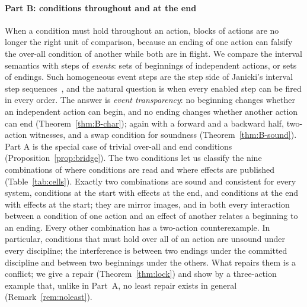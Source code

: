 \documentclass[preprint,12pt]{elsarticle}
\theoremstyle{plain}
\theoremstyle{definition}
\begin{document}
\paragraph{Part B: conditions throughout and at the end}
When a condition must hold throughout an action, blocks of actions are no longer the right unit of comparison, because an ending of one action can falsify the over-all condition of another while both are in flight. We compare the interval semantics with steps of \emph{events}: sets of beginnings of independent actions, or sets of endings. Such homogeneous event steps are the step side of Janicki's interval step sequences~\cite{Janicki2019}, and the natural question is when every enabled step can be fired in every order. The answer is \emph{event transparency}: no beginning changes whether an independent action can begin, and no ending changes whether another action can end (Theorem~\ref{thm:B-char}); again with a forward and a backward half, two-action witnesses, and a swap condition for soundness (Theorem~\ref{thm:B-sound}). Part A is the special case of trivial over-all and end conditions (Proposition~\ref{prop:bridge}). The two conditions let us classify the nine combinations of where conditions are read and where effects are published (Table~\ref{tab:cells}). Exactly two combinations are sound and consistent for every system, conditions at the start with effects at the end, and conditions at the end with effects at the start; they are mirror images, and in both every interaction between a condition of one action and an effect of another relates a beginning to an ending. Every other combination has a two-action counterexample. In particular, conditions that must hold over all of an action are unsound under every discipline; the interference is between two endings under the committed discipline and between two beginnings under the others. What repairs them is a conflict; we give a repair (Theorem~\ref{thm:lock}) and show by a three-action example that, unlike in Part~A, no least repair exists in general (Remark~\ref{rem:noleast}).
\end{document}
